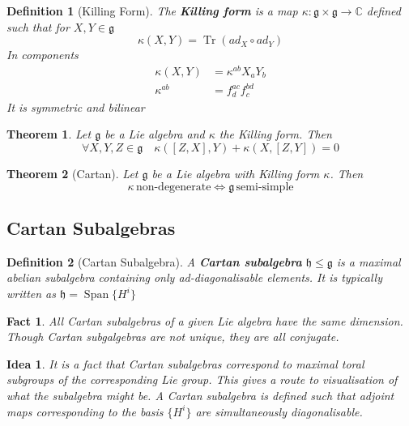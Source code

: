 \documentclass{article}
\newtheorem{theorem}{Theorem}[subsection]
\newtheorem{definition}{Definition}[subsection]
\newtheorem{fact}{Fact}[subsection]
\newtheorem*{idea}{Idea}
\DeclareMathOperator{\spn}{Span}
\DeclareMathOperator{\tr}{Tr}
\newcommand{\bam}[1]{\textbf{#1}}
\newcommand{\mf}[1]{\mathfrak{#1}}
\newcommand{\mbb}[1]{\mathbb{#1}}
\newcommand{\comm}[2][]{\left[ #1, #2 \right]}
\begin{document}
\begin{definition}[Killing Form]
The \bam{Killing form} is a map $\kappa:\mf{g}\times\mf{g}\to\mbb{C}$ defined such that for $X,Y\in\mf{g}$
\[
\kappa\left(X,Y\right)=\tr\left(ad_X \circ ad_Y\right)
\]
In components 
\begin{align*}
    \kappa(X,Y) &= \kappa^{ab}X_a Y_b \\
    \kappa^{ab} &= f^{ac}_d f^{bd}_c
\end{align*}
It is symmetric and bilinear 
\end{definition}

\begin{theorem}
Let $\mf{g}$ be a Lie algebra and $\kappa$ the Killing form. Then
\[
\forall X,Y,Z\in\mf{g} \quad \kappa\left(\comm[Z]{X},Y\right)+\kappa\left(X,\comm[Z]{Y}\right)=0
\]
\end{theorem}

\begin{theorem}[Cartan]
Let $\mf{g}$ be a Lie algebra with Killing form $\kappa$. Then 
\[
\kappa \, \text{non-degenerate} \Leftrightarrow \mf{g} \, \text{semi-simple}
\]
\end{theorem}

\subsection{Cartan Subalgebras}

\begin{definition}[Cartan Subalgebra]
A \bam{Cartan subalgebra} $\mf{h}\leq\mf{g}$ is a maximal abelian subalgebra containing only ad-diagonalisable elements. It is typically written as $\mf{h}=\spn\lbrace H^i \rbrace$
\end{definition}

\begin{fact}
All Cartan subalgebras of a given Lie algebra have the same dimension. Though Cartan subgalgebras are not unique, they are all conjugate. 
\end{fact}

\begin{idea}
It is a fact that Cartan subalgebras correspond to maximal toral subgroups of the corresponding Lie group. This gives a route to visualisation of what the subalgebra might be. A Cartan subalgebra is defined such that adjoint maps corresponding to the basis $\lbrace H^i \rbrace$ are simultaneously diagonalisable. 
\end{idea}
\end{document}
